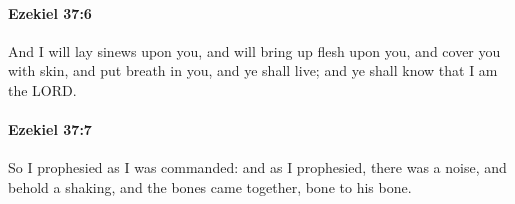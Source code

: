 		\paragraph{Ezekiel 37:6} %
			\label{EZEKIEL-37-6}

			And I will lay sinews upon you, and will bring up flesh upon you, and cover you with skin, and put breath in you, and ye shall live; and ye shall know that I am the LORD.


		\paragraph{Ezekiel 37:7} %
			\label{EZEKIEL-37-7}

			So I prophesied as I was commanded: and as I prophesied, there was a noise, and behold a shaking, and the bones came together, bone to his bone.



